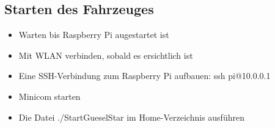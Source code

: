 \subsection{Starten des Fahrzeuges}
\begin{itemize}
\item Warten bis Raspberry Pi augestartet ist
\item Mit WLAN verbinden, sobald es ersichtlich ist
\item Eine SSH-Verbindung zum Raspberry Pi aufbauen: ssh pi@10.0.0.1
\item Minicom starten
\item Die Datei ./StartGueselStar im Home-Verzeichnis ausführen
\end{itemize}

